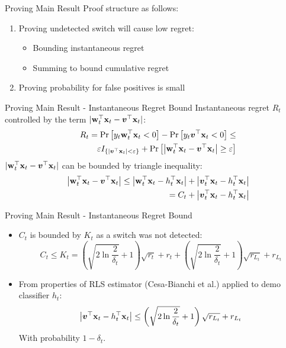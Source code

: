 \documentclass{beamer}
\begin{document}
\begin{frame}{Proving Main Result}
Proof structure as follows:\newline
\begin{enumerate}
\item Proving undetected switch will cause low regret:\newline
\begin{itemize}
\item Bounding instantaneous regret \newline
\item Summing to bound cumulative regret \newline
\end{itemize}
\item Proving probability for false positives is small
\end{enumerate}
\end{frame}

\begin{frame}{Proving Main Result - Instantaneous Regret Bound}
Instantaneous regret $R_t$ controlled by the term $|{\mathbf{w}}^{\top}_{t}\mathbf{x}_{t}-{{\boldsymbol{v}}}^{\top}\mathbf{x}_{t}|$:
\begin{eqnarray*}
&&R_t={\rm Pr}\left[{y_t{\mathbf{w}}^{\top}_{t}\mathbf{x}_{t}<0}\right]-{\rm Pr}\left[{y_t{{\boldsymbol{v}}}^{\top}\mathbf{x}_{t}<0}\right]\leq\nonumber\\
&&\varepsilon I_{\{\left|{{\boldsymbol{v}}}^{\top}\mathbf{x}_{t}\right|<\varepsilon\}}+{\rm Pr}\left[{\left|{\mathbf{w}}^{\top}_{t}\mathbf{x}_{t}-{{\boldsymbol{v}}}^{\top}\mathbf{x}_{t}\right|\geq\varepsilon}\right]
\label{regret_wt_ht1}
\end{eqnarray*}
$|{\mathbf{w}}^{\top}_{t}\mathbf{x}_{t}-{{\boldsymbol{v}}}^{\top}\mathbf{x}_{t}|$ can be bounded by triangle inequality:
\begin{eqnarray*}
&&\left\vert{\mathbf{w}}^{\top}_{t}\mathbf{x}_{t}-{{\boldsymbol{v}}}^{\top}\mathbf{x}_{t}\right\vert\leq\left\vert{\mathbf{w}}^{\top}_{t}\mathbf{x}_{t}-h_{t}^{\top}\mathbf{x}_{t}\right\vert+\left\vert{{\boldsymbol{v}}}^{\top}_{t}\mathbf{x}_{t}-h_{t}^{\top}\mathbf{x}_{t}\right\vert\nonumber\\
&&=C_t+\left\vert{{\boldsymbol{v}}}^{\top}_{t}\mathbf{x}_{t}-h_{t}^{\top}\mathbf{x}_{t}\right\vert
\label{triangl_ht_wt}
\end{eqnarray*}
\end{frame}

\begin{frame}{Proving Main Result - Instantaneous Regret Bound}
\begin{itemize}
\item $C_t$ is bounded by $K_t$ as a switch was not detected:
\begin{equation*}
C_t\leq K_t=\left(\sqrt{2\ln{\frac{2}{\delta_t}}}+1\right)\sqrt{r_t}+r_t+\left(\sqrt{2\ln{\frac{2}{\delta_t}}}+1\right)\sqrt{r_{L_t}}+r_{L_t} 
\end{equation*}
\item From properties of RLS estimator (Cesa-Bianchi et al.) applied to demo classifier $h_t$:
\begin{equation*}
\left\vert{{\boldsymbol{v}}}^{\top}\mathbf{x}_{t}-h_{t}^{\top}\mathbf{x}_{t}\right\vert\leq\left(\sqrt{2\ln{\frac{2}{\delta_t}}}+1\right)\sqrt{r_{L_t}}+r_{L_t}
\label{rLt_false}
\end{equation*}
With probability $1-\delta_t$.
\end{itemize}
\end{frame}
\end{document}
